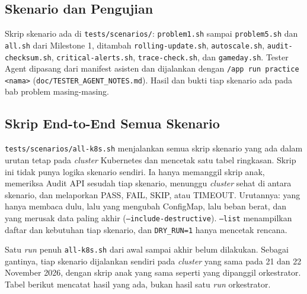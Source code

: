 \subsection{Skenario dan Pengujian}

Skrip skenario ada di \texttt{tests/scenarios/}: \texttt{problem1.sh} sampai \texttt{problem5.sh} dan \texttt{all.sh} dari Milestone 1, ditambah \texttt{rolling-update.sh}, \texttt{autoscale.sh}, \texttt{audit-checksum.sh}, \texttt{critical-alerts.sh}, \texttt{trace-check.sh}, dan \texttt{gameday.sh}. Tester Agent dipasang dari manifest asisten dan dijalankan dengan \texttt{/app run practice <nama>} (\texttt{doc/TESTER\_AGENT\_NOTES.md}). Hasil dan bukti tiap skenario ada pada bab problem masing-masing.

\subsection{Skrip End-to-End Semua Skenario}

\texttt{tests/scenarios/all-k8s.sh} menjalankan semua skrip skenario yang ada dalam urutan tetap pada \textit{cluster} Kubernetes dan mencetak satu tabel ringkasan. Skrip ini tidak punya logika skenario sendiri. Ia hanya memanggil skrip anak, memeriksa Audit API sesudah tiap skenario, menunggu \textit{cluster} sehat di antara skenario, dan melaporkan PASS, FAIL, SKIP, atau TIMEOUT. Urutannya: yang hanya membaca dulu, lalu yang mengubah ConfigMap, lalu beban berat, dan yang merusak data paling akhir (\texttt{--include-destructive}). \texttt{--list} menampilkan daftar dan kebutuhan tiap skenario, dan \texttt{DRY\_RUN=1} hanya mencetak rencana.

Satu \textit{run} penuh \texttt{all-k8s.sh} dari awal sampai akhir belum dilakukan. Sebagai gantinya, tiap skenario dijalankan sendiri pada \textit{cluster} yang sama pada 21 dan 22 November 2026, dengan skrip anak yang sama seperti yang dipanggil orkestrator. Tabel berikut mencatat hasil yang ada, bukan hasil satu \textit{run} orkestrator.

